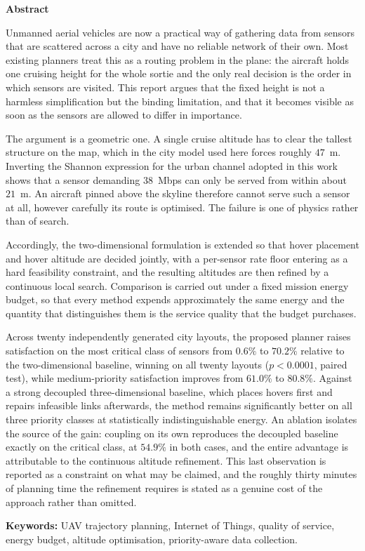 {\renewcommand{\baselinestretch}{1.5}
\begin{center}
	{\Large\bf{Abstract}}
\end{center}
\vspace{0.4cm}

\noindent Unmanned aerial vehicles are now a practical way of gathering data from sensors that are scattered across a city and have no reliable network of their own. Most existing planners treat this as a routing problem in the plane: the aircraft holds one cruising height for the whole sortie and the only real decision is the order in which sensors are visited. This report argues that the fixed height is not a harmless simplification but the binding limitation, and that it becomes visible as soon as the sensors are allowed to differ in importance.

\vspace{0.2cm}
\noindent The argument is a geometric one. A single cruise altitude has to clear the tallest structure on the map, which in the city model used here forces roughly $47$~m. Inverting the Shannon expression for the urban channel adopted in this work shows that a sensor demanding $38$~Mbps can only be served from within about $21$~m. An aircraft pinned above the skyline therefore cannot serve such a sensor at all, however carefully its route is optimised. The failure is one of physics rather than of search.

\vspace{0.2cm}
\noindent Accordingly, the two-dimensional formulation is extended so that hover placement and hover altitude are decided jointly, with a per-sensor rate floor entering as a hard feasibility constraint, and the resulting altitudes are then refined by a continuous local search. Comparison is carried out under a fixed mission energy budget, so that every method expends approximately the same energy and the quantity that distinguishes them is the service quality that the budget purchases.

\vspace{0.2cm}
\noindent Across twenty independently generated city layouts, the proposed planner raises satisfaction on the most critical class of sensors from $0.6\%$ to $70.2\%$ relative to the two-dimensional baseline, winning on all twenty layouts ($p<0.0001$, paired test), while medium-priority satisfaction improves from $61.0\%$ to $80.8\%$. Against a strong decoupled three-dimensional baseline, which places hovers first and repairs infeasible links afterwards, the method remains significantly better on all three priority classes at statistically indistinguishable energy. An ablation isolates the source of the gain: coupling on its own reproduces the decoupled baseline exactly on the critical class, at $54.9\%$ in both cases, and the entire advantage is attributable to the continuous altitude refinement. This last observation is reported as a constraint on what may be claimed, and the roughly thirty minutes of planning time the refinement requires is stated as a genuine cost of the approach rather than omitted.

\vspace{0.2cm}
\noindent \textbf{Keywords:} UAV trajectory planning, Internet of Things, quality of service, energy budget, altitude optimisation, priority-aware data collection.
}
